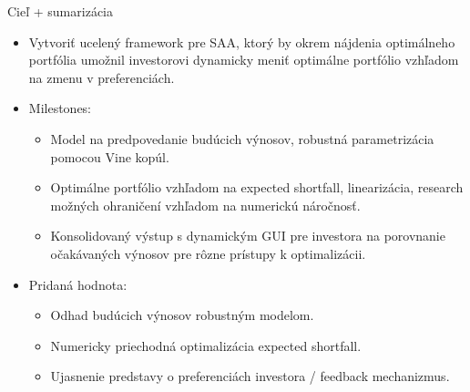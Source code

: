 \documentclass{Bredelebeamer}
\begin{document}
\begin{frame}{Cieľ + sumarizácia}
	\begin{itemize}
		\item Vytvoriť ucelený framework pre SAA, ktorý by okrem nájdenia optimálneho portfólia umožnil investorovi dynamicky meniť optimálne portfólio vzhľadom na zmenu v preferenciách.
		\pause\item Milestones:
		\begin{itemize}
			\item Model na predpovedanie budúcich výnosov, robustná parametrizácia pomocou Vine kopúl.
			\item Optimálne portfólio vzhľadom na expected shortfall, linearizácia, research možných ohraničení vzhľadom na numerickú náročnosť.
			\item Konsolidovaný výstup s dynamickým GUI pre investora na porovnanie očakávaných výnosov pre rôzne prístupy k optimalizácii.
		\end{itemize}
		\pause\item Pridaná hodnota:
		\begin{itemize}
			\item Odhad budúcich výnosov robustným modelom.
			\item Numericky priechodná optimalizácia expected shortfall.
			\item Ujasnenie predstavy o preferenciách investora / feedback mechanizmus.
		\end{itemize}
	\end{itemize}	
\end{frame}
\end{document}

